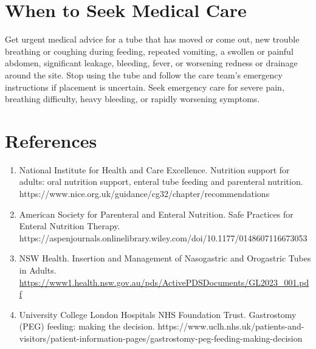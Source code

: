 \section*{When to Seek Medical Care}
Get urgent medical advice for a tube that has moved or come out, new trouble breathing or coughing during feeding, repeated vomiting, a swollen or painful abdomen, significant leakage, bleeding, fever, or worsening redness or drainage around the site. Stop using the tube and follow the care team's emergency instructions if placement is uncertain. Seek emergency care for severe pain, breathing difficulty, heavy bleeding, or rapidly worsening symptoms.

\section*{References}
\begin{enumerate}
  \item National Institute for Health and Care Excellence. Nutrition support for adults: oral nutrition support, enteral tube feeding and parenteral nutrition. https://www.nice.org.uk/guidance/cg32/chapter/recommendations
  \item American Society for Parenteral and Enteral Nutrition. Safe Practices for Enteral Nutrition Therapy. https://aspenjournals.onlinelibrary.wiley.com/doi/10.1177/0148607116673053
  \item NSW Health. Insertion and Management of Nasogastric and Orogastric Tubes in Adults. \url{https://www1.health.nsw.gov.au/pds/ActivePDSDocuments/GL2023_001.pdf}
  \item University College London Hospitals NHS Foundation Trust. Gastrostomy (PEG) feeding: making the decision. https://www.uclh.nhs.uk/patients-and-visitors/patient-information-pages/gastrostomy-peg-feeding-making-decision
\end{enumerate}

\clearpage
